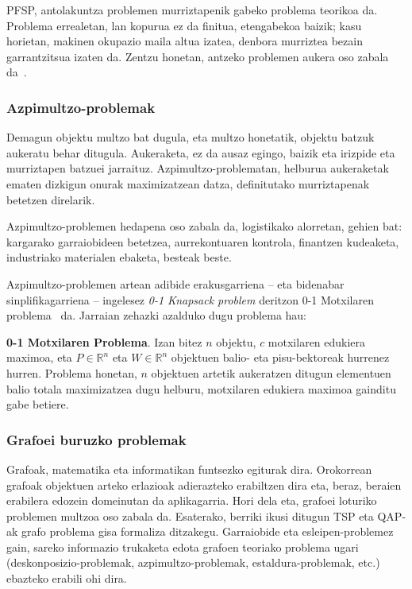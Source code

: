 \documentclass[eu]{ifirak}\usepackage[]{graphicx}\usepackage[]{color}
\begin{document}
PFSP, antolakuntza problemen murriztapenik gabeko problema teorikoa da. Problema errealetan, lan kopurua ez da finitua, etengabekoa baizik; kasu horietan, makinen okupazio maila altua izatea, denbora murriztea bezain garrantzitsua izaten da. Zentzu honetan, antzeko problemen aukera oso zabala da~\cite{taillard1993}.

\subsubsection{Azpimultzo-problemak}\label{sec:subset_problems}

Demagun objektu multzo bat dugula, eta multzo honetatik, objektu batzuk aukeratu behar ditugula. Aukeraketa, ez da ausaz egingo, baizik eta irizpide eta murriztapen batzuei jarraituz. Azpimultzo-problematan, helburua aukeraketak ematen dizkigun onurak maximizatzean datza, definitutako murriztapenak betetzen direlarik.

Azpimultzo-problemen hedapena oso zabala da, logistikako alorretan, gehien bat: kargarako garraiobideen betetzea, aurrekontuaren kontrola, finantzen kudeaketa, industriako materialen ebaketa, besteak beste.

Azpimultzo-problemen artean adibide erakusgarriena -- eta bidenabar sinplifikagarriena -- ingelesez \textit{0-1 Knapsack problem} deritzon 0-1 Motxilaren problema~\cite{kellerer2004} da. Jarraian zehazki azalduko dugu problema hau:

\begin{ifdefinition} {\bf 0-1 Motxilaren Problema}. Izan bitez $n$ objektu, $c$ motxilaren edukiera maximoa, eta $P\in\mathbb{R}^n$ eta $W\in\mathbb{R}^n$ objektuen balio- eta pisu-bektoreak hurrenez hurren. Problema honetan, $n$ objektuen artetik aukeratzen ditugun elementuen balio totala maximizatzea dugu helburu, motxilaren edukiera maximoa gainditu gabe betiere. 
\end{ifdefinition}


\subsubsection{Grafoei buruzko problemak}
Grafoak, matematika eta informatikan funtsezko egiturak dira. Orokorrean grafoak objektuen arteko erlazioak adierazteko erabiltzen dira eta, beraz, beraien erabilera edozein domeinutan da aplikagarria. Hori dela eta, grafoei loturiko problemen multzoa oso zabala da. Esaterako, berriki ikusi ditugun TSP eta QAP-ak grafo problema gisa formaliza ditzakegu. Garraiobide eta esleipen-problemez gain, sareko informazio trukaketa edota grafoen teoriako problema ugari (deskonposizio-problemak, azpimultzo-problemak, estaldura-problemak, etc.) ebazteko erabili ohi dira.
\end{document}
